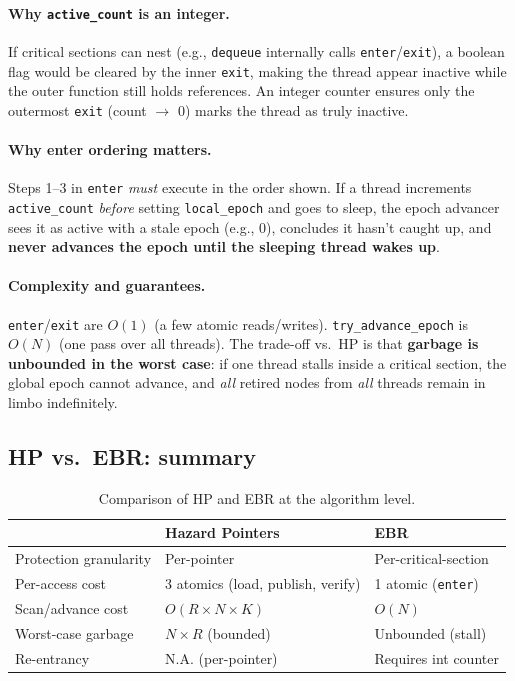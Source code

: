 \documentclass[11pt,a4paper]{article}
\begin{document}
\paragraph{Why \texttt{active\_count} is an integer.}
If critical sections can nest (e.g., \texttt{dequeue} internally calls
\texttt{enter}/\texttt{exit}), a boolean flag would be cleared by the inner
\texttt{exit}, making the thread appear inactive while the outer function
still holds references.  An integer counter ensures only the outermost
\texttt{exit} (count $\to$ 0) marks the thread as truly inactive.

\paragraph{Why enter ordering matters.}
Steps 1--3 in \texttt{enter} \emph{must} execute in the order shown.  If a
thread increments \texttt{active\_count} \emph{before} setting
\texttt{local\_epoch} and goes to sleep, the epoch advancer sees it as active with a stale epoch (e.g., 0), concludes it hasn't caught up, and \textbf{never advances the
epoch until the sleeping thread wakes up}.

\paragraph{Complexity and guarantees.}
\texttt{enter}/\texttt{exit} are $O(1)$ (a few atomic reads/writes).
\texttt{try\_advance\_epoch} is $O(N)$ (one pass over all threads).  The
trade-off vs.\ HP is that \textbf{garbage is unbounded in the worst case}: if
one thread stalls inside a critical section, the global epoch cannot advance,
and \emph{all} retired nodes from \emph{all} threads remain in limbo
indefinitely.

\subsection{HP vs.\ EBR: summary}

\begin{table}[ht]
\centering\small
\caption{Comparison of HP and EBR at the algorithm level.}
\label{tab:hpvsebr}
\begin{tabular}{@{}lll@{}}
\toprule
& \textbf{Hazard Pointers} & \textbf{EBR} \\
\midrule
Protection granularity & Per-pointer & Per-critical-section \\
Per-access cost & 3 atomics (load, publish, verify) & 1 atomic
  (\texttt{enter}) \\
Scan/advance cost & $O(R \times N \times K)$ & $O(N)$ \\
Worst-case garbage & $N \times R$ (bounded) & Unbounded (stall) \\
Re-entrancy & N.A. (per-pointer) & Requires int counter \\
\bottomrule
\end{tabular}
\end{table}
\end{document}
